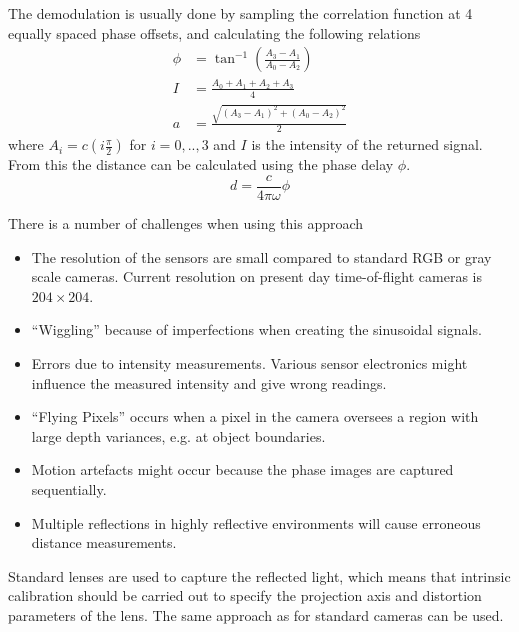 The demodulation is usually done by sampling the correlation function at 4 equally spaced
phase offsets, and calculating the following relations
\begin{equation}
    \begin{aligned}
        \phi &= \tan^{-1} (\frac{A_3 - A_1}{A_0 - A_2}) \\
        I &= \frac{A_0 + A_1 + A_2 + A_3}{4} \\
        a &= \frac{\sqrt{(A_3 - A_1)^2 + (A_0 - A_2)^2}}{2}
    \end{aligned}
\end{equation}
where $A_i = c(i \frac{\pi}{2})$ for $ i = 0,..,3$ and $I$ is the intensity of the returned 
signal. From this the distance can be calculated using the phase delay $\phi$. 
\begin{equation}
    d = \frac{c}{4 \pi \omega} \phi
\end{equation}

There is a number of challenges when using this approach
\cite{time-of-flight-comp-graphics}
\begin{itemize}
    \item The resolution of the sensors are small compared to standard RGB or gray scale
        cameras. Current resolution on present day time-of-flight cameras is $204 \times
        204$. 
    \item ``Wiggling'' because of imperfections when creating the sinusoidal signals.
    \item Errors due to intensity measurements. Various sensor electronics might influence
        the measured intensity and give wrong readings.
    \item ``Flying Pixels'' occurs when a pixel in the camera oversees a region with
        large depth variances, e.g. at object boundaries.
    \item Motion artefacts might occur because the phase images are captured sequentially.
    \item Multiple reflections in highly reflective environments will cause erroneous
        distance measurements.
\end{itemize}

Standard lenses are used to capture the reflected light, which means that intrinsic
calibration should be carried out to specify the projection axis and distortion parameters
of the lens. The same approach as for standard cameras can be used. \cite{time-of-flight-comp-graphics}


